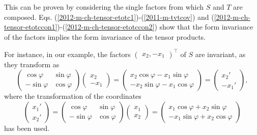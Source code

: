 {This can be proven by considering the single factors from which $S$ and $T$ are composed.
Eqs. (\ref{2012-m-ch-tensor-etotc1})-(\ref{2011-m-tvtcov})
and
(\ref{2012-m-ch-tensor-etotccon1})-(\ref{2012-m-ch-tensor-etotccon2})
show that the form
invariance of the factors implies the form invariance of the tensor products.

For instance, in our example, the factors $\begin{pmatrix}  {  x}_2 ,- {  x}_1  \end{pmatrix}^\intercal $
of $S$ are invariant, as they transform as
$$
\begin{pmatrix} \cos \varphi & \sin \varphi  \\
                         -\sin \varphi & \cos \varphi
\end{pmatrix}
\begin{pmatrix}
{  x}_2  \\
 - {  x}_1
\end{pmatrix}
=
\begin{pmatrix}
 {  x}_2 \cos \varphi  - x_1 \sin \varphi  \\
            - x_2 \sin \varphi         - {  x}_1 \cos \varphi
\end{pmatrix}
=
\begin{pmatrix}
{  x}_2'  \\
 - {  x}_1'
\end{pmatrix},
$$
where the transformation of the coordinates
$$
\begin{pmatrix}
{  x}_1'  \\
  {  x}_2'
\end{pmatrix}
=
\begin{pmatrix}
 \cos \varphi & \sin \varphi  \\
   -\sin \varphi & \cos \varphi
\end{pmatrix}
\begin{pmatrix}
 {  x}_1  \\
 {  x}_2
\end{pmatrix}
=
\begin{pmatrix}
{  x}_1 \cos \varphi  + x_2 \sin \varphi  \\
- x_1 \sin \varphi         + {  x}_2 \cos \varphi
\end{pmatrix}
$$
has been used.


}
